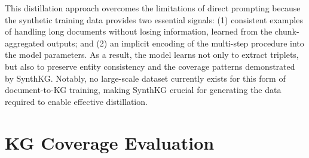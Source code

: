 \documentclass{article} %
\begin{document}
This distillation approach overcomes the limitations of direct prompting because the synthetic training data provides two essential signals: (1) consistent examples of handling long documents without losing information, learned from the chunk-aggregated outputs; and (2) an implicit encoding of the multi-step procedure into the model parameters. As a result, the model learns not only to extract triplets, but also to preserve entity consistency and the coverage patterns demonstrated by SynthKG. Notably, no large-scale dataset currently exists for this form of document-to-KG training, making SynthKG crucial for generating the data required to enable effective distillation.




\section{KG Coverage Evaluation} 
\label{sec:kg-eval}
\end{document}

